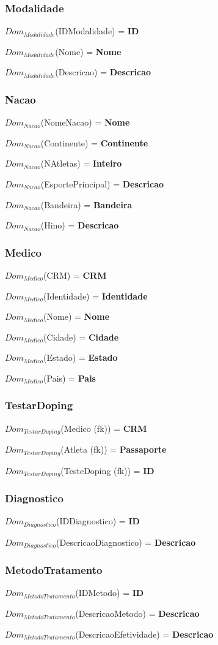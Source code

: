 \documentclass[12pt,a4paper]{article}
\newcommand{\createdomain}[3]{
    $Dom_{#1}$(#2) = {\bf #3}

}
\begin{document}
    \subsubsection{Modalidade}
        \createdomain{Modalidade}{IDModalidade}{\bf ID}
        \createdomain{Modalidade}{Nome}{\bf Nome}
        \createdomain{Modalidade}{Descricao}{\bf Descricao}

    \subsubsection{Nacao}
        \createdomain{Nacao}{NomeNacao}{\bf Nome}
        \createdomain{Nacao}{Continente}{\bf Continente}
        \createdomain{Nacao}{NAtletas}{\bf Inteiro}
        \createdomain{Nacao}{EsportePrincipal}{\bf Descricao}
        \createdomain{Nacao}{Bandeira}{\bf Bandeira}
        \createdomain{Nacao}{Hino}{\bf Descricao}

    \subsubsection{Medico}
        \createdomain{Medico}{CRM}{\bf CRM}
        \createdomain{Medico}{Identidade}{\bf Identidade}
        \createdomain{Medico}{Nome}{\bf Nome}
        \createdomain{Medico}{Cidade}{\bf Cidade}
        \createdomain{Medico}{Estado}{\bf Estado}
        \createdomain{Medico}{Pais}{\bf Pais}

    \subsubsection{TestarDoping}
        \createdomain{TestarDoping}{Medico (fk)}{\bf CRM}
        \createdomain{TestarDoping}{Atleta (fk)}{\bf Passaporte}
        \createdomain{TestarDoping}{TesteDoping (fk)}{\bf ID}

    \subsubsection{Diagnostico}
        \createdomain{Diagnostico}{IDDiagnostico}{\bf ID}
        \createdomain{Diagnostico}{DescricaoDiagnostico}{\bf Descricao}

    \subsubsection{MetodoTratamento}
        \createdomain{MetodoTratamento}{IDMetodo}{\bf ID}
        \createdomain{MetodoTratamento}{DescricaoMetodo}{\bf Descricao}
        \createdomain{MetodoTratamento}{DescricaoEfetividade}{\bf Descricao}
\end{document}
